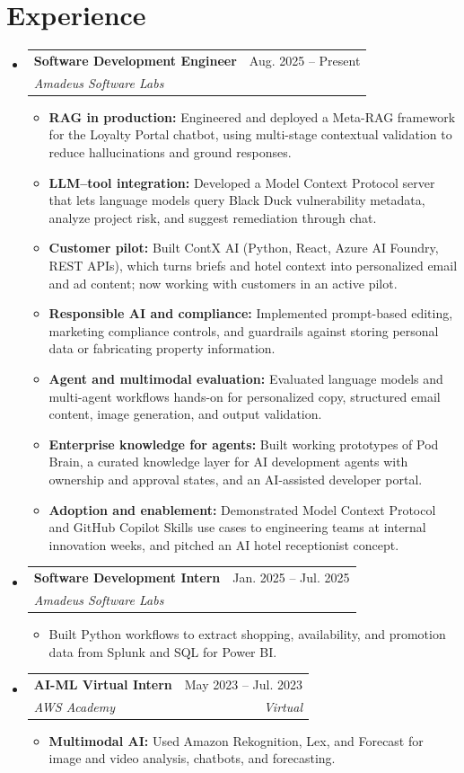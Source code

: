 \documentclass[a4paper,11pt]{article}
\makeatletter
\newcommand{\entry}[4]{\item\begin{tabularx}{\textwidth}{@{}Xr@{}}\textbf{#1}& #2\\\textit{\small #3}&\textit{\small #4}\end{tabularx}\vspace{-5pt}}
\newcommand{\bulletpoint}[1]{\item\small{#1}}
\makeatother
\begin{document}
\section{Experience}
\begin{itemize}[leftmargin=0in,label={}]
  \entry{Software Development Engineer}{Aug. 2025 -- Present}{Amadeus Software Labs}{}
  \begin{itemize}
    \bulletpoint{\textbf{RAG in production:} Engineered and deployed a Meta-RAG framework for the Loyalty Portal chatbot, using multi-stage contextual validation to reduce hallucinations and ground responses.}
    \bulletpoint{\textbf{LLM--tool integration:} Developed a Model Context Protocol server that lets language models query Black Duck vulnerability metadata, analyze project risk, and suggest remediation through chat.}
    \bulletpoint{\textbf{Customer pilot:} Built ContX AI (Python, React, Azure AI Foundry, REST APIs), which turns briefs and hotel context into personalized email and ad content; now working with customers in an active pilot.}
    \bulletpoint{\textbf{Responsible AI and compliance:} Implemented prompt-based editing, marketing compliance controls, and guardrails against storing personal data or fabricating property information.}
    \bulletpoint{\textbf{Agent and multimodal evaluation:} Evaluated language models and multi-agent \mbox{workf{}lows} hands-on for personalized copy, structured email content, image generation, and output validation.}
    \bulletpoint{\textbf{Enterprise knowledge for agents:} Built working prototypes of Pod Brain, a curated knowledge layer for AI development agents with ownership and approval states, and an AI-assisted developer portal.}
    \bulletpoint{\textbf{Adoption and enablement:} Demonstrated Model Context Protocol and GitHub Copilot Skills use cases to engineering teams at internal innovation weeks, and pitched an AI hotel receptionist concept.}
  \end{itemize}
  \entry{Software Development Intern}{Jan. 2025 -- Jul. 2025}{Amadeus Software Labs}{}
  \begin{itemize}
    \bulletpoint{Built Python workf{}lows to extract shopping, availability, and promotion data from Splunk and SQL for Power BI.}
  \end{itemize}
  \entry{AI-ML Virtual Intern}{May 2023 -- Jul. 2023}{AWS Academy}{Virtual}
  \begin{itemize}
    \bulletpoint{\textbf{Multimodal AI:} Used Amazon Rekognition, Lex, and Forecast for image and video analysis, chatbots, and forecasting.}
  \end{itemize}
\end{itemize}
\end{document}
